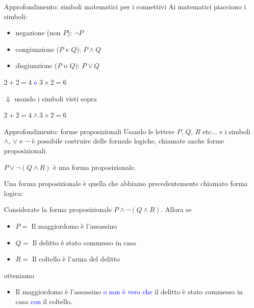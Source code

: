 \documentclass[aspectratio=169,10pt]{beamer}
\newcommand{\conn}[1]{\textcolor{blue}{#1}}
\begin{document}
\begin{frame}{Approfondimento: simboli matematici per i connettivi}
    Ai matematici piacciono i simboli:
    \begin{definition}
        \begin{itemize}
            \item negazione (non $P$):  $\neg P$
            \item congiunzione ($P$ e $Q$):  $P \wedge Q$
            \item disgiunzione ($P$ o $Q$):  $P \vee Q$

        \end{itemize}
    \end{definition}
    \begin{example}
        $2 + 2 = 4$ \conn{e} $3 \times 2 = 6$\medskip

        \hspace{2cm}$\Downarrow$ usando i simboli visti sopra \medskip

        $2 + 2 = 4 \wedge 3 \times 2 = 6$
    \end{example}
\end{frame}

\begin{frame}{Approfondimento: forme proposizionali}
   Usando le lettere $P$, $Q$, $R$ etc... e i simboli $\wedge$, $\vee$ e $\neg$ è possibile costruire delle \alert{formule logiche}, chiamate anche \alert{forme proposizionali}.
   \begin{example}
   $P \vee \neg (Q \wedge R)$ è una forma proposizionale.
   \end{example}
   \pause
   Una forma proposizionale è quella che abbiamo precedentemente chiamato \alert{forma logica}:
   \begin{example}
       Considerate la forma proposizionale  $P \wedge \neg (Q \wedge R)$. Allora se
       \begin{itemize}
       \item $P={}$ Il maggiordomo è l'assassino
       \item $Q={}$ Il delitto è stato commesso in casa
       \item $R={}$ Il coltello è l'arma del delitto
       \end{itemize}
       otteniamo
       \begin{itemize}
           \item Il maggiordomo è l'assassino \conn{o} \conn{non è vero che} il delitto è stato commesso in casa \conn{con} il coltello.
       \end{itemize}
   \end{example}
\end{frame}
\end{document}
